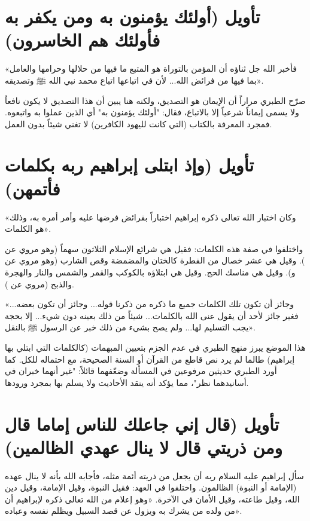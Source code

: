 \separator

\section{تأويل (أولئك يؤمنون به ومن يكفر به فأولئك هم الخاسرون)}
 «فأخبر الله جل ثناؤه أن المؤمن بالتوراة هو المتبع ما فيها من حلالها وحرامها والعامل بما فيها من فرائض الله... لأن في اتباعها اتباع محمد نبي الله ﷺ وتصديقه».

\begin{fawaid}
صرّح الطبري مراراً أن الإيمان هو التصديق، ولكنه هنا يبين أن هذا التصديق لا يكون نافعاً ولا يسمى إيماناً شرعياً إلا بالاتباع، فقال: "أولئك يؤمنون به" أي الذين عملوا به واتبعوه. فمجرد المعرفة بالكتاب (التي كانت لليهود الكافرين) لا تغني شيئاً بدون العمل.
\end{fawaid}

\separator

\section{تأويل (وإذ ابتلى إبراهيم ربه بكلمات فأتمهن)}
 «وكان اختبار الله تعالى ذكره إبراهيم اختباراً بفرائض فرضها عليه وأمر أمره به، وذلك هو الكلمات».

واختلفوا في صفة هذه الكلمات:
فقيل هي شرائع الإسلام الثلاثون سهماً (وهو مروي عن ).
وقيل هي عشر خصال من الفطرة كالختان والمضمضة وقص الشارب (وهو مروي عن  و).
وقيل هي مناسك الحج. وقيل هي ابتلاؤه بالكوكب والقمر والشمس والنار والهجرة والذبح (مروي عن ).

 «وجائز أن تكون تلك الكلمات جميع ما ذكره من ذكرنا قوله... وجائز أن تكون بعضه... فغير جائز لأحد أن يقول عنى الله بالكلمات... شيئاً من ذلك بعينه دون شيء... إلا بحجة يجب التسليم لها... ولم يصح بشيء من ذلك خبر عن الرسول ﷺ بالنقل».

\begin{fawaid}
هذا الموضع يبرز منهج الطبري في عدم الجزم بتعيين المبهمات (كالكلمات التي ابتلي بها إبراهيم) طالما لم يرد نص قاطع من القرآن أو السنة الصحيحة، مع احتماله للكل.
كما أورد الطبري حديثين مرفوعين في المسألة وضعّفهما قائلاً: "غير أنهما خبران في أسانيدهما نظر"، مما يؤكد أنه ينقد الأحاديث ولا يسلم بها بمجرد ورودها.
\end{fawaid}

\separator

\section{تأويل (قال إني جاعلك للناس إماما قال ومن ذريتي قال لا ينال عهدي الظالمين)}
سأل إبراهيم عليه السلام ربه أن يجعل من ذريته أئمة مثله، فأجابه الله بأنه لا ينال عهده (الإمامة أو النبوة) الظالمون.
واختلفوا في العهد: فقيل النبوة، وقيل الإمامة، وقيل دين الله، وقيل طاعته، وقيل الأمان في الآخرة.
 «وهو إعلام من الله تعالى ذكره لإبراهيم أن من ولده من يشرك به ويزول عن قصد السبيل ويظلم نفسه وعباده».

